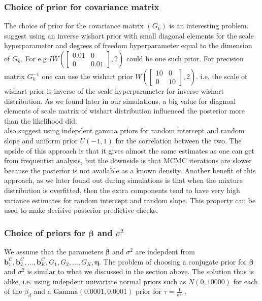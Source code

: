 \subsubsection{Choice of prior for covariance matrix}
The choice of prior for the covariance matrix $(G_k)$ is an interesting problem. \citet[pg. 260]{lesaffre_bayesian_2012} suggest using an inverse wishart prior with small diagonal elements for the scale hyperparameter and degrees of freedom hyperparameter equal to the dimension of $G_k$. For e.g $IW(\begin{bmatrix}0.01 & 0 \\ 0 & 0.01\end{bmatrix}, 2)$ could be one such prior. For precision matrix $G_k^{-1}$ one can use the wishart prior $W(\begin{bmatrix}10 & 0 \\ 0 & 10\end{bmatrix}, 2)$. i.e. the scale of wishart prior is inverse of the scale hyperparameter for inverse wishart distribution. As we found later in our simulations, a big value for diagnoal elements of scale matrix of wishart distribution influenced the posterior more than the likelihood did.\\

 \citet[pg. 260]{lesaffre_bayesian_2012} also suggest using indepdent gamma priors for random intercept and random slope and uniform prior $U(-1,1)$ for the correlation between the two. The upside of this approach is that it gives almost the same estimates as one can get from frequentist analysis, but the downside is that MCMC iterations are slower because the posterior is not available as a known density. Another benefit of this approach, as we later found out during simulations is that when the mixture distribution is overfitted, then the extra components tend to have very high variance estimates for random intercept and random slope. This property can be used to make decisive posterior predictive checks.

\subsubsection{Choice of priors for $\boldsymbol{\beta}$ and $\sigma^2$}
We assume that the parameters $\boldsymbol{\beta}$ and $\sigma^2$ are indepdent from $\boldsymbol{b}_1^C, \boldsymbol{b}_2^C, ..., \boldsymbol{b}_K^C, G_1, G_2, ..., G_K, \boldsymbol{\eta}$. The problem of choosing a conjugate prior for $\boldsymbol{\beta}$ and $\sigma^2$ is similar to what we discussed in the section above. The solution thus is alike, i.e. using indepdent univariate normal priors such as $N(0, 10000)$ for each of the $\beta_d$ and a $\text{Gamma}(0.0001, 0.0001)$ prior for $\tau = \frac 1 {\sigma^2}$ \citep[chap. 17]{gelman_data_2006}.


